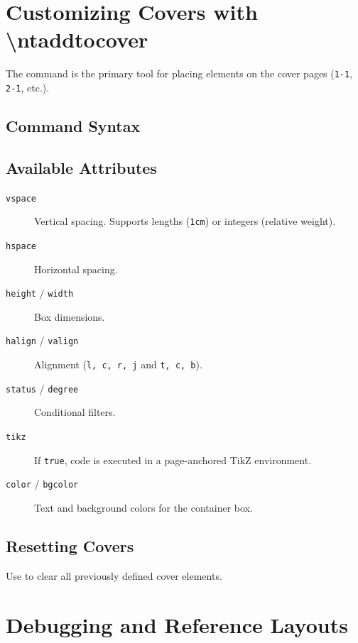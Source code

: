 \section{Customizing Covers with \textbackslash ntaddtocover}
\label{sec:ntaddtocover}

The \latexinline{\ntaddtocover} command is the primary tool for placing elements on the cover pages (\texttt{1-1}, \texttt{2-1}, etc.).

\subsection{Command Syntax}
\begin{center}
\end{center}

\subsection{Available Attributes}
\begin{description}
  \item[\texttt{vspace}] Vertical spacing. Supports lengths (\texttt{1cm}) or integers (relative \latexinline{\vfill} weight).
  \item[\texttt{hspace}] Horizontal spacing.
  \item[\texttt{height} / \texttt{width}] Box dimensions.
  \item[\texttt{halign} / \texttt{valign}] Alignment (\texttt{l, c, r, j} and \texttt{t, c, b}).
  \item[\texttt{status} / \texttt{degree}] Conditional filters.
  \item[\texttt{tikz}] If \texttt{true}, code is executed in a page-anchored TikZ environment.
  \item[\texttt{color} / \texttt{bgcolor}] Text and background colors for the container box.
\end{description}

\subsection{Resetting Covers}
Use \latexinline{\ntresetcovers} to clear all previously defined cover elements.

\section{Debugging and Reference Layouts}
\label{sec:debugging}

